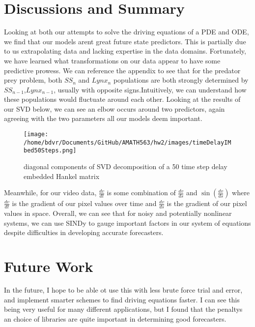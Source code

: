 \documentclass[12pt]{article}
\begin{document}
	\section[see]{Discussions and Summary}
	Looking at both our attempts to solve the driving equations of a PDE and ODE, we find that our models arent great future state predictors. This is partially due to us extrapolating data and lacking expertise in the data domains. Fortunately, we have learned what transformations on our data appear to have some predictive prowess. We can reference the appendix to see that for the predator prey problem, both $SS_n$ and $Lynx_n$ populations are both strongly determined by  $SS_{n-1}$,$Lynx_{n-1}$, usually with opposite signs.Intuitively, we can understand how these populations would fluctuate around each other. Looking at the results of our SVD below, we can see an elbow occurs around two predictors, again agreeing with the two parameters all our models deem important. 
	\begin{wrapfigure}[11]{l}{3.25in}
		\texttt{[image: /home/bdvr/Documents/GitHub/AMATH563/hw2/images/timeDelayIMbed50Steps.png]}
		\caption{diagonal components of SVD decomposition of a 50 time step delay embedded Hankel matrix}
	\end{wrapfigure}
	Meanwhile, for our video data, $\frac{dv}{dt}$ is some combination of $\frac{dv}{ds}$ and $\sin(\frac{dv}{ds})$ where $\frac{dv}{dt}$ is the gradient of our pixel values over time and $\frac{dv}{ds}$ is the gradient of our pixel values in space. Overall, we can see that for noisy and potentially nonlinear systems, we can use SINDy to gauge important factors in our system of equations despite difficulties in developing accurate forecasters.
	\\
	\section{Future Work}
	In the future, I hope to be able ot use this with less brute force trial and error, and implement smarter schemes to find driving equations faster. I can see this being very useful for many different applications, but I found that the penaltys an choice of libraries are quite important in determining good forecasters.
\end{document}
